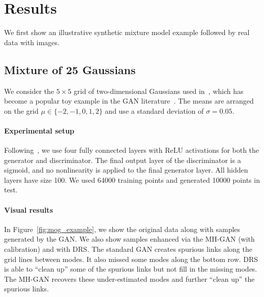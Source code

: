 \documentclass{article}
\renewcommand{\vec}[1]{{\boldsymbol{\mathbf{#1}}}} %
\newcommand{\R}{\mathbb{R}}
\begin{document}




\section{Results}
\label{sec:Results}

We first show an illustrative synthetic mixture model example followed by real data with images.

\subsection{Mixture of 25 Gaussians}

We consider the $5 \times 5$ grid of two-dimensional Gaussians used in~\citet{Azadi2018}, which has become a popular toy example in the GAN literature~\citep{Dumoulin2016}.
The means are arranged on the grid $\mu \in \{{-2},{-1},0,1,2\}$ and use a standard deviation of $\sigma = 0.05$.

\paragraph{Experimental setup}
Following~\citet{Azadi2018}, we use four fully connected layers with ReLU activations for both the generator and discriminator.
The final output layer of the discriminator is a sigmoid, and no nonlinearity is applied to the final generator layer.
All hidden layers have size 100.
We used \num{64000} training points and generated \num{10000} points in test.

\paragraph{Visual results}
In Figure~\ref{fig:mog_example}, we show the original data along with samples generated by the GAN\@.
We also show samples enhanced via the MH-GAN (with calibration) and with DRS\@.
The standard GAN creates spurious links along the grid lines between modes.
It also missed some modes along the bottom row.
DRS is able to ``clean up'' some of the spurious links but not fill in the missing modes.
The MH-GAN recovers these under-estimated modes and further ``clean up'' the spurious links.
\end{document}

